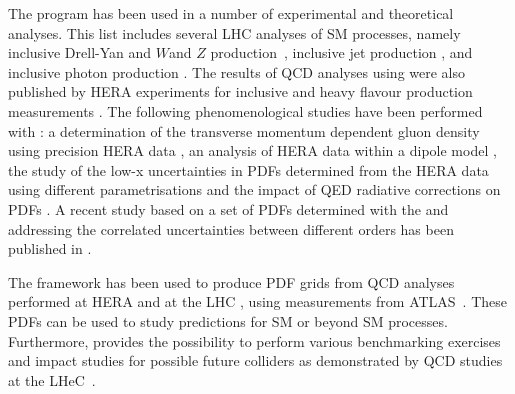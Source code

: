 The \fitter program has been used in a number of experimental and theoretical analyses. 
This list includes several LHC analyses of SM processes, namely
inclusive Drell-Yan and $W$and $Z$ production~\cite{atlas:strange,cms:strange,atlas:hm,Aad:2014qja,Aad:2014xca}, 
inclusive jet production \cite{atlas:jets}, and inclusive photon production \cite{atlas:photons}.
The results of QCD analyses using \fitter were also
published by HERA experiments for inclusive \cite{h1zeus:2009wt,h1:2012kk} and
 heavy flavour production measurements \cite{h1zeus:charm, Abramowicz:2014zub}.
The following phenomenological studies have been performed with \fitter:
a determination of the transverse momentum dependent gluon density using precision HERA data \cite{Hautmann:2013tba}, 
an analysis of HERA data within a dipole model \cite{Luszczak:2013rxa},
the study of the low-x uncertainties in PDFs determined from the HERA data using 
different parametrisations \cite{Chebyshev} and the impact of QED radiative corrections on PDFs \cite{Sadykov:2014aua}.
A recent study based on a set of PDFs determined with the \fitter and addressing 
the correlated uncertainties between different orders has been published in \cite{hfcorrpaper}. 

The \fitter framework has been used to produce PDF grids from QCD analyses performed at 
HERA \cite{h1zeus:2009wt,hera:grids} and at the LHC \cite{atlas:grids}, using 
measurements from ATLAS~\cite{atlas:strange,atlas:jets}. These PDFs can be used to study predictions for SM 
or beyond SM processes. Furthermore, \fitter provides the possibility to perform various benchmarking exercises
\cite{Butterworth:2014efa} and impact studies for possible future colliders
as demonstrated by QCD studies at the LHeC~\cite{lhec:studies}.









